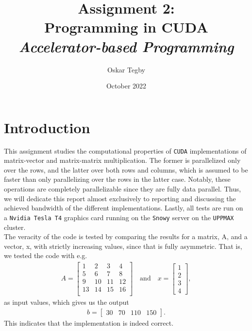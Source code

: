 \documentclass[9pt]{article}
\title{Assignment 2: \\ Programming in CUDA \\ \large \textit{Accelerator-based Programming}}
\author{Oskar Tegby}
\date{October 2022}
\begin{document}
\maketitle


\section{Introduction}
This assignment studies the computational properties of \texttt{CUDA} implementations of matrix-vector and matrix-matrix multiplication. The former is parallelized only over the rows, and the latter over both rows and columns, which is assumed to be faster than only parallelizing over the rows in the latter case. Notably, these operations are completely parallelizable since they are fully data parallel. Thus, we will dedicate this report almost exclusively to reporting and discussing the achieved bandwidth of the different implementations. Lastly, all tests are run on a \texttt{Nvidia Tesla T4} graphics card running on the \texttt{Snowy} server on the \texttt{UPPMAX} cluster. \\

The veracity of the code is tested by comparing the results for a matrix, A, and a vector, x, with strictly increasing values, since that is fully asymmetric. That is, we tested the code with e.g.
\begin{align*}
    A=
    \begin{bmatrix}
        1 & 2 & 3 & 4 \\
        5 & 6 & 7 & 8 \\
        9 & 10 & 11 & 12 \\
        13 & 14 & 15 & 16 \\
    \end{bmatrix}
    \quad\text{and}\quad
    x=
    \begin{bmatrix}
        1 \\
        2 \\
        3 \\
        4
    \end{bmatrix},
\end{align*}
as input values, which gives us the output
\begin{align*}
    b=
    \begin{bmatrix}
        30 & 70 & 110 & 150
    \end{bmatrix}.
\end{align*}
This indicates that the implementation is indeed correct. \\
\end{document}
